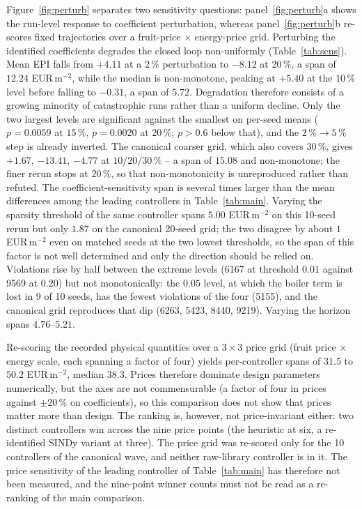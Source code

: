 Figure~\ref{fig:perturb} separates two sensitivity questions: panel~\ref{fig:perturb}a
shows the run-level response to coefficient perturbation, whereas panel~\ref{fig:perturb}b
re-scores fixed trajectories over a fruit-price $\times$ energy-price grid. Perturbing the
identified coefficients degrades the closed loop non-uniformly
(Table~\ref{tab:sens}). Mean EPI falls from $+4.11$ at a
$2\,\%$ perturbation to $-8.12$ at
$20\,\%$, a span of $12.24$ EUR\,m$^{-2}$, while the median is non-monotone, peaking at $+5.40$ at the
$10\,\%$ level before falling to $-0.31$, a span of $5.72$. Degradation therefore consists
of a growing minority of catastrophic runs rather than a uniform decline. Only the two
largest levels are significant
against the smallest on per-seed means ($p=0.0059$ at $15\,\%$, $p=0.0020$ at $20\,\%$;
$p>0.6$ below that), and the $2\,\%\to5\,\%$ step is already inverted. The canonical
coarser grid, which also covers $30\,\%$, gives $+1.67$, $-13.41$, $-4.77$ at
$10/20/30\,\%$ -- a span of $15.08$ and non-monotone; the finer rerun stops at $20\,\%$, so
that non-monotonicity is unreproduced rather than refuted. The coefficient-sensitivity
span is several times larger than the mean differences among the leading controllers in
Table~\ref{tab:main}. Varying the sparsity threshold of the same controller spans $5.00$
EUR\,m$^{-2}$ on this 10-seed rerun but only $1.87$ on the canonical 20-seed grid; the two
disagree by about $1$ EUR\,m$^{-2}$ even on matched seeds at the two lowest thresholds, so
the span of this factor is not well determined and only the direction should be relied on.
Violations rise by half between the extreme levels (6167 at threshold $0.01$ against 9569
at $0.20$) but not monotonically: the $0.05$ level, at which the boiler term is lost
in 9 of 10 seeds, has the fewest violations of the four (5155), and the canonical grid
reproduces that dip (6263, 5423, 8440, 9219). Varying the horizon spans $4.76$--$5.21$.

Re-scoring the recorded physical quantities over a $3\times3$ price grid (fruit price
$\times$ energy scale, each spanning a factor of four) yields per-controller spans of
$31.5$ to $50.2$ EUR\,m$^{-2}$, median $38.3$. Prices therefore dominate design parameters
numerically, but the axes are not commensurable (a factor of four in prices against
$\pm20\,\%$ on coefficients), so this comparison does not show that prices matter more than
design. The ranking is, however, not price-invariant either: two distinct controllers win
across the nine price points (the heuristic at six, a re-identified SINDy variant at
three). The price grid was re-scored only for the 10 controllers of the canonical wave,
and neither raw-library controller is in it. The price sensitivity
of the leading controller of Table~\ref{tab:main} has therefore not been measured, and the
nine-point winner counts must not be read as a re-ranking of the main comparison.

